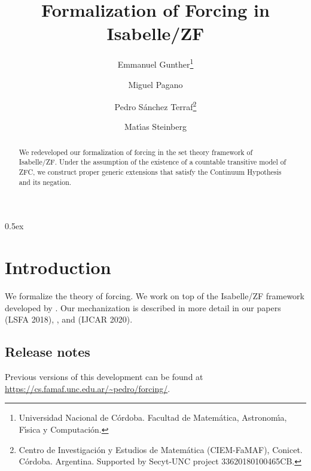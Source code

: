 \documentclass[11pt,a4paper]{article}
\begin{document}
\title{Formalization of Forcing in Isabelle/ZF}
\author{Emmanuel Gunther\thanks{Universidad Nacional de C\'ordoba. 
    Facultad de Matem\'atica, Astronom\'{\i}a,  F\'{\i}sica y
    Computaci\'on.}
  \and
  Miguel Pagano\footnotemark[1]
  \and
  Pedro S\'anchez Terraf\footnotemark[1] \thanks{Centro de Investigaci\'on y Estudios de Matem\'atica
    (CIEM-FaMAF), Conicet. C\'ordoba. Argentina.
    Supported by Secyt-UNC project 33620180100465CB.}
  \and
  Mat\'{\i}as Steinberg\footnotemark[1]
}
\maketitle

\begin{abstract}
  We redeveloped our formalization of forcing in the set theory framework of
  Isabelle/ZF. Under the assumption of the existence of a countable
  transitive model of ZFC, we construct proper generic extensions 
  that satisfy the Continuum Hypothesis and its negation.
\end{abstract}


\tableofcontents

\parindent 0pt\parskip 0.5ex

\section{Introduction}
We formalize the theory of forcing. We work on top of the Isabelle/ZF
framework developed by \citet{DBLP:journals/jar/PaulsonG96}. Our
mechanization is described in more detail in our papers
\cite{2018arXiv180705174G} (LSFA 2018), \cite{2019arXiv190103313G},
and \cite{2020arXiv200109715G} (IJCAR 2020).

\subsection*{Release notes}
\label{sec:release-notes}

Previous versions of this development can be found at
\url{https://cs.famaf.unc.edu.ar/~pedro/forcing/}.





\end{document}
